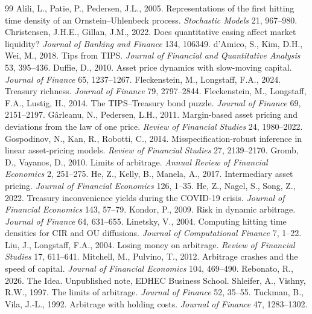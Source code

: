 \documentclass[11pt]{article}
\begin{document}
\begin{thebibliography}{99}
 Alili, L., Patie, P., Pedersen, J.L., 2005. Representations of the first hitting time density of an Ornstein--Uhlenbeck process. \emph{Stochastic Models} 21, 967--980.
 Christensen, J.H.E., Gillan, J.M., 2022. Does quantitative easing affect market liquidity? \emph{Journal of Banking and Finance} 134, 106349.
 d'Amico, S., Kim, D.H., Wei, M., 2018. Tips from TIPS. \emph{Journal of Financial and Quantitative Analysis} 53, 395--436.
 Duffie, D., 2010. Asset price dynamics with slow-moving capital. \emph{Journal of Finance} 65, 1237--1267.
 Fleckenstein, M., Longstaff, F.A., 2024. Treasury richness. \emph{Journal of Finance} 79, 2797--2844.
 Fleckenstein, M., Longstaff, F.A., Lustig, H., 2014. The TIPS--Treasury bond puzzle. \emph{Journal of Finance} 69, 2151--2197.
 G\^arleanu, N., Pedersen, L.H., 2011. Margin-based asset pricing and deviations from the law of one price. \emph{Review of Financial Studies} 24, 1980--2022.
 Gospodinov, N., Kan, R., Robotti, C., 2014. Misspecification-robust inference in linear asset-pricing models. \emph{Review of Financial Studies} 27, 2139--2170.
 Gromb, D., Vayanos, D., 2010. Limits of arbitrage. \emph{Annual Review of Financial Economics} 2, 251--275.
 He, Z., Kelly, B., Manela, A., 2017. Intermediary asset pricing. \emph{Journal of Financial Economics} 126, 1--35.
 He, Z., Nagel, S., Song, Z., 2022. Treasury inconvenience yields during the COVID-19 crisis. \emph{Journal of Financial Economics} 143, 57--79.
 Kondor, P., 2009. Risk in dynamic arbitrage. \emph{Journal of Finance} 64, 631--655.
 Linetsky, V., 2004. Computing hitting time densities for CIR and OU diffusions. \emph{Journal of Computational Finance} 7, 1--22.
 Liu, J., Longstaff, F.A., 2004. Losing money on arbitrage. \emph{Review of Financial Studies} 17, 611--641.
 Mitchell, M., Pulvino, T., 2012. Arbitrage crashes and the speed of capital. \emph{Journal of Financial Economics} 104, 469--490.
 Rebonato, R., 2026. The Idea. Unpublished note, EDHEC Business School.
 Shleifer, A., Vishny, R.W., 1997. The limits of arbitrage. \emph{Journal of Finance} 52, 35--55.
 Tuckman, B., Vila, J.-L., 1992. Arbitrage with holding costs. \emph{Journal of Finance} 47, 1283--1302.
\end{thebibliography}
\end{document}
